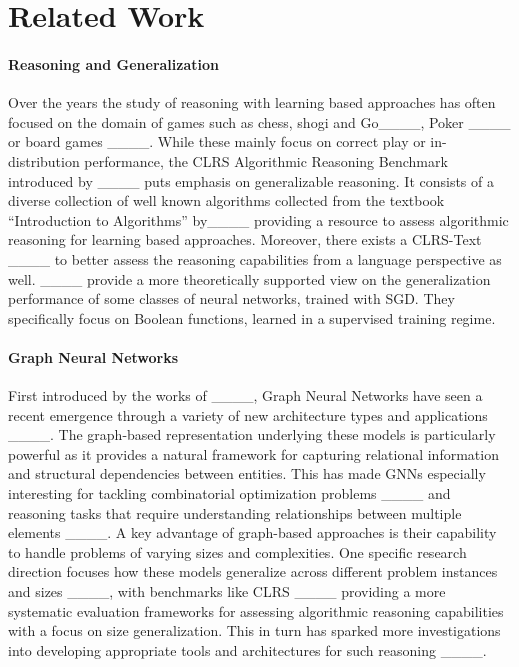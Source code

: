 \section{Related Work}
\paragraph{Reasoning and Generalization}
    Over the years the study of reasoning with learning based approaches has often focused on the domain of games such as chess, shogi and Go____, Poker ____ or board games ____.
    While these mainly focus on correct play or in-distribution performance, the CLRS Algorithmic Reasoning Benchmark introduced by ____ puts emphasis on generalizable reasoning. It consists of a diverse collection of well known algorithms collected from the textbook ``Introduction to Algorithms'' by____ providing a resource to assess algorithmic reasoning for learning based approaches. Moreover, there exists a CLRS-Text ____ to better assess the reasoning capabilities from a language perspective as well. 
    ____ provide a more theoretically supported view on the generalization performance of some classes of neural networks, trained with SGD.
    They specifically focus on Boolean functions, learned in a supervised training regime.
    

\paragraph{Graph Neural Networks} First introduced by the works of ____, Graph Neural Networks have seen a recent emergence through a variety of new architecture types and applications ____. The graph-based representation underlying these models is particularly powerful as it provides a natural framework for capturing relational information and structural dependencies between entities. This has made GNNs especially interesting for tackling combinatorial optimization problems ____ and reasoning tasks that require understanding relationships between multiple elements ____. A key advantage of graph-based approaches is their capability to handle problems of varying sizes and complexities. One specific research direction focuses how these models generalize across different problem instances and sizes ____, with benchmarks like CLRS ____ providing a more systematic evaluation frameworks for assessing algorithmic reasoning capabilities with a focus on size generalization. This in turn has sparked more investigations into developing appropriate tools and architectures for such reasoning ____.